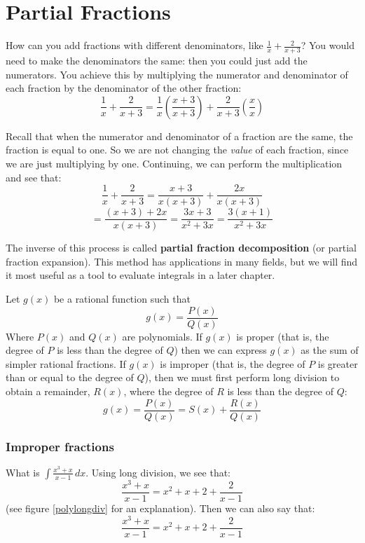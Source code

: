 \chapter{Partial Fractions}

How can you add fractions with different denominators, like $\frac{1}{x} + 
\frac{2}{x + 3}$? You would need to make the denominators the same: then you 
could just add the numerators. You achieve this by multiplying the numerator 
and denominator of each fraction by the denominator of the other fraction:
$$\frac{1}{x} + \frac{2}{x + 3} = \frac{1}{x} \left( \frac{x + 3}{x + 3} 
\right) + \frac{2}{x + 3} \left( \frac{x}{x} \right)$$

Recall that when the numerator and denominator of a fraction are the same, the 
fraction is equal to one. So we are not changing the \textit{value} of each 
fraction, since we are just multiplying by one. Continuing, we can perform the 
multiplication and see that:
$$\frac{1}{x} + \frac{2}{x + 3} = \frac{x + 3}{x(x + 3)} + \frac{2x}{x(x + 3)}$$
$$= \frac{(x + 3) + 2x}{x(x + 3)} = \frac{3x + 3}{x^2 + 3x} = \frac{3(x + 1)}{x
^2 + 3x}$$

The inverse of this process is called \textbf{partial fraction decomposition} 
(or partial fraction expansion). This 
method has applications in many fields, but we will find it most useful as a 
tool to evaluate integrals in a later chapter. 


Let $g(x)$ be a rational function such that 
$$g(x) = \frac{P(x)}{Q(x)}$$
Where $P(x)$ and $Q(x)$ are polynomials. If $g(x)$ is proper (that is, the 
degree of $P$ is less than the degree of $Q$) then we can express $g(x)$ as 
the sum of simpler rational fractions. If $g(x)$ is improper (that is, the 
degree of $P$ is greater than or equal to the degree of $Q$), then we must 
first perform long division to obtain a remainder, $R(x)$, where the degree 
of $R$ is less than the degree of $Q$:
$$g(x) = \frac{P(x)}{Q(x)} = S(x) + \frac{R(x)}{Q(x)}$$

\subsection{Improper fractions}
What is $\int \frac{x^3 + x}{x-1}\,dx$. Using long division, we see that:
$$\frac{x^3 + x}{x - 1} = x^2 + x + 2 + \frac{2}{x - 1}$$
(see figure \ref{polylongdiv} for an explanation). Then we can also say that:
$$\frac{x^3 + x}{x-1} = x^2 + x + 2 + \frac{2}{x-1}$$

